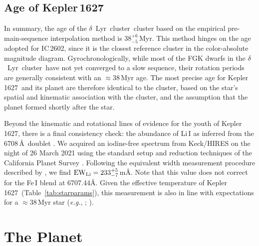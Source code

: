 \documentclass[12pt,modern,twocolumn,tighten]{aastex63}
\newcommand{\cn}{$\delta$\ Lyr\ cluster} %
\newcommand{\sn}{Kepler\,1627} %
\newcommand{\clusterage}{$38^{+6}_{-5}$\,Myr} %
\begin{document}
\subsection{Age of Kepler\,1627}

In summary, the age of the \cn\ cluster based on the empirical
pre-main-sequence interpolation method is \clusterage.  This method
hinges on the age adopted for IC\,2602, since it is the closest
reference cluster in the color-absolute magnitude diagram.
Gyrochronologically, while most of the FGK dwarfs in the \cn\ have
not yet converged to a slow sequence, their rotation periods 
are generally consistent with an $\approx$38\,Myr age. The most
precise age for \sn\ and its planet are therefore identical to the cluster,
based on the star's spatial and kinematic association with the
cluster, and the assumption that the planet formed shortly after
the star.

Beyond the kinematic and rotational lines of evidence for the youth of
\sn, there is a final consistency check: the abundance of
Li\,\textsc{I} as inferred from the 6708\,\AA\ doublet \citep[see {\it
e.g.},][]{soderblom_ages_2014}.  We acquired an iodine-free spectrum
from Keck/HIRES on the night of 26 March 2021 using the standard setup
and reduction techniques of the California Planet Survey
\citep{howard_cps_2010}.  Following the equivalent width measurement
procedure described by \citet{bouma_2021_ngc2516}, we find ${\rm
EW}_{\rm Li} = 233^{+5}_{-7}$\,m\AA.   Note that this value does not
correct for the Fe\,\textsc{I} blend at 6707.44\AA.  Given the
effective temperature of \sn\ (Table~\ref{tab:starparams}), this
measurement is also in line with expectations for a $\approx$38\,Myr
star ({\it e.g.}, \citealt{randich_gaiaeso_2018};
\citealt{bouma_2021_ngc2516}).


\section{The Planet}
\label{sec:planet}
\end{document}
